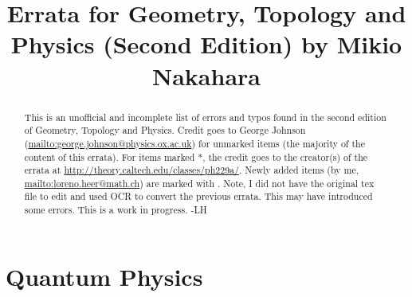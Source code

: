 \documentclass{article}
\title{Errata for Geometry, Topology and Physics (Second
  Edition) by Mikio Nakahara}
\begin{document}
\maketitle
\begin{abstract}This is an unofficial and incomplete list of errors and typos found in the second edition
of Geometry, Topology and Physics. Credit goes to George Johnson (\url{mailto:george.johnson@physics.ox.ac.uk}) for unmarked items (the majority of the content of this errata).
For items marked *, the credit goes
to the creator(s) of the errata at \url{http://theory.caltech.edu/classes/ph229a/}.
Newly added items (by me, \url{mailto:loreno.heer@math.ch}) are marked with \dagger.
Note, I did not have the original tex file to edit and used OCR to convert the previous errata. This may
have introduced some errors. This is a work in progress. -LH
\end{abstract}
\section*{Quantum Physics}
\end{document}
